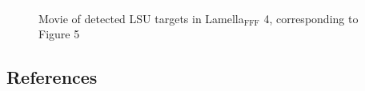 \documentclass[
]{article}
\newenvironment{fignos:tagged-figure}[1][]{
    \let\oldthefigure\thefigure
    \let\oldtheHfigure\theHfigure
    \renewcommand{\thefigure}{#1}
    \renewcommand{\theHfigure}{#1}
  }{
    \let\thefigure\oldthefigure
    \let\theHfigure\oldtheHfigure
    \addtocounter{figure}{-1}
  }
\providecommand{\DIFaddbegin}{} %
\providecommand{\DIFaddend}{} %
\providecommand{\DIFdelbegin}{} %
\providecommand{\DIFdelend}{} %
\providecommand{\DIFaddbeginFL}{} %
\providecommand{\DIFaddendFL}{} %
\providecommand{\DIFdelbeginFL}{} %
\providecommand{\DIFdelendFL}{} %
\newcommand{\DIFscaledelfig}{0.5}
\newlength{\DIFdelgraphicswidth} %
\newlength{\DIFdelgraphicsheight} %
\newcommand{\DIFaddincludegraphics}[2][]{{\color{blue}\fbox{\DIFOincludegraphics[#1]{#2}}}} %
\newcommand{\DIFdelincludegraphics}[2][]{%
\sbox{\DIFdelgraphicsbox}{\DIFOincludegraphics[#1]{#2}}%
\settoboxwidth{\DIFdelgraphicswidth}{\DIFdelgraphicsbox} %
\settoboxtotalheight{\DIFdelgraphicsheight}{\DIFdelgraphicsbox} %
\scalebox{\DIFscaledelfig}{%
\parbox[b]{\DIFdelgraphicswidth}{\usebox{\DIFdelgraphicsbox}\\[-\baselineskip] \rule{\DIFdelgraphicswidth}{0em}}\llap{\resizebox{\DIFdelgraphicswidth}{\DIFdelgraphicsheight}{%
\setlength{\unitlength}{\DIFdelgraphicswidth}%
\begin{picture}(1,1)%
\thicklines\linethickness{2pt} %
{\color[rgb]{1,0,0}\put(0,0){\framebox(1,1){}}}%
{\color[rgb]{1,0,0}\put(0,0){\line( 1,1){1}}}%
{\color[rgb]{1,0,0}\put(0,1){\line(1,-1){1}}}%
\end{picture}%
}\hspace*{3pt}}} %
} %
\DeclareRobustCommand{\DIFaddbegin}{\DIFOaddbegin \let\includegraphics\DIFaddincludegraphics} %
\DeclareRobustCommand{\DIFaddend}{\DIFOaddend \let\includegraphics\DIFOincludegraphics} %
\DeclareRobustCommand{\DIFdelbegin}{\DIFOdelbegin \let\includegraphics\DIFdelincludegraphics} %
\DeclareRobustCommand{\DIFdelend}{\DIFOaddend \let\includegraphics\DIFOincludegraphics} %
\DeclareRobustCommand{\DIFaddbeginFL}{\DIFOaddbeginFL \let\includegraphics\DIFaddincludegraphics} %
\DeclareRobustCommand{\DIFaddendFL}{\DIFOaddendFL \let\includegraphics\DIFOincludegraphics} %
\DeclareRobustCommand{\DIFdelbeginFL}{\DIFOdelbeginFL \let\includegraphics\DIFdelincludegraphics} %
\DeclareRobustCommand{\DIFdelendFL}{\DIFOaddendFL \let\includegraphics\DIFOincludegraphics} %
\begin{document}
\DIFdelbegin %
\DIFdelend \DIFaddbegin \begin{fignos:tagged-figure}
\DIFaddend 

\begin{figure}
\DIFdelbeginFL %
\DIFdelendFL \DIFaddbeginFL \hypertarget{fig:movie2}{%
\centering
\includegraphics{images/1x1-00000000.png}
\caption{Movie of detected LSU targets in Lamella\(_\textrm{FFF}\) 4,
corresponding to Figure 5}\label{fig:movie2}
}
\DIFaddendFL \end{figure}

\end{fignos:tagged-figure}

\hypertarget{references}{%
\subsection{References}\label{references}}
\end{document}
